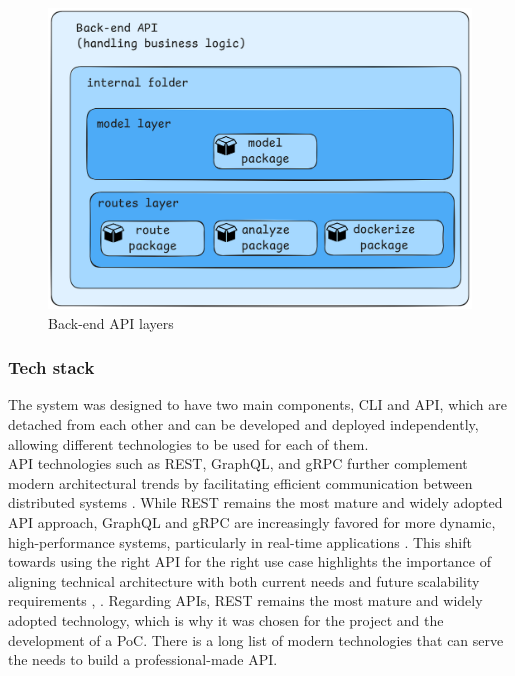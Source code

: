 \documentclass[twocolumn]{article}
\begin{document}
\begin{figure}[H]
    \centering
    \includegraphics[width=\linewidth]{images/back-end-api-layers.png}
    \caption{Back-end API layers}
    \label{fig:back-end-api-layers}
\end{figure}

\subsubsection{Tech stack}
The system was designed to have two main components, CLI and API, which are detached from each other and can be developed and deployed independently, allowing different technologies to be used for each of them. \\

API technologies such as REST, GraphQL, and gRPC further complement modern architectural trends by facilitating efficient communication between distributed systems \cite{Ali-2024}. While REST remains the most mature and widely adopted API approach, GraphQL and gRPC are increasingly favored for more dynamic, high-performance systems, particularly in real-time applications \cite{Ali-2024}. This shift towards using the right API for the right use case highlights the importance of aligning technical architecture with both current needs and future scalability requirements \cite{Nivedhaa-2024}, \cite{Ali-2024}. Regarding APIs, REST remains the most mature and widely adopted technology, which is why it was chosen for the project and the development of a PoC. There is a long list of modern technologies that can serve the needs to build a professional-made API. \\
\end{document}
